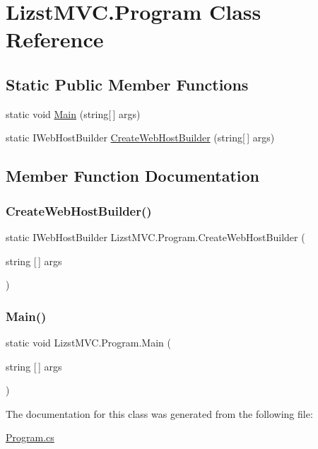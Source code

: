 \hypertarget{class_lizst_m_v_c_1_1_program}{}\section{Lizst\+M\+V\+C.\+Program Class Reference}
\label{class_lizst_m_v_c_1_1_program}
\subsection*{Static Public Member Functions}
\begin{DoxyCompactItemize}
\item 
static void \mbox{\hyperlink{class_lizst_m_v_c_1_1_program_a58325cf7c2b72495b6ab842cf6a35dff}{Main}} (string\mbox{[}$\,$\mbox{]} args)
\item 
static I\+Web\+Host\+Builder \mbox{\hyperlink{class_lizst_m_v_c_1_1_program_a363f84fc71c16013155172a36fb04923}{Create\+Web\+Host\+Builder}} (string\mbox{[}$\,$\mbox{]} args)
\end{DoxyCompactItemize}


\subsection{Member Function Documentation}
\mbox{\label{class_lizst_m_v_c_1_1_program_a363f84fc71c16013155172a36fb04923}} 
\subsubsection{\texorpdfstring{CreateWebHostBuilder()}{CreateWebHostBuilder()}}
{\footnotesize\ttfamily static I\+Web\+Host\+Builder Lizst\+M\+V\+C.\+Program.\+Create\+Web\+Host\+Builder (\begin{DoxyParamCaption}\item[{string \mbox{[}$\,$\mbox{]}}]{args }\end{DoxyParamCaption})\hspace{0.3cm}{\ttfamily [static]}}

\mbox{\label{class_lizst_m_v_c_1_1_program_a58325cf7c2b72495b6ab842cf6a35dff}} 
\subsubsection{\texorpdfstring{Main()}{Main()}}
{\footnotesize\ttfamily static void Lizst\+M\+V\+C.\+Program.\+Main (\begin{DoxyParamCaption}\item[{string \mbox{[}$\,$\mbox{]}}]{args }\end{DoxyParamCaption})\hspace{0.3cm}{\ttfamily [static]}}



The documentation for this class was generated from the following file\+:\begin{DoxyCompactItemize}
\item 
\mbox{\hyperlink{_program_8cs}{Program.\+cs}}\end{DoxyCompactItemize}
